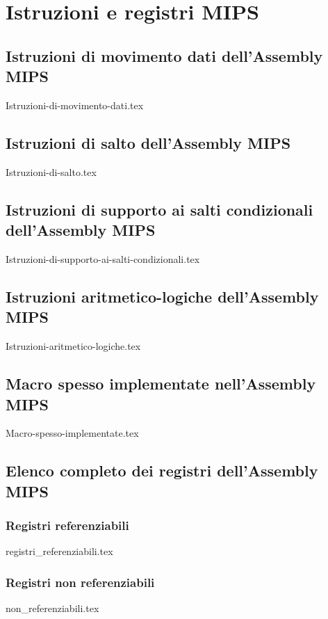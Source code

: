 \documentclass[class=book, crop=false, oneside]{standalone}
\begin{document}

\chapter{Istruzioni e registri MIPS}
\section*{Istruzioni di movimento dati dell'Assembly MIPS}
\begin{table}[H]
	\centering
	{Istruzioni-di-movimento-dati.tex}
\end{table}

\section*{Istruzioni di salto dell'Assembly MIPS}
\begin{table}[H]
	\centering
	{Istruzioni-di-salto.tex}
\end{table}

\section*{Istruzioni di supporto ai salti condizionali dell'Assembly MIPS}
\begin{table}[H]
	\centering
	{Istruzioni-di-supporto-ai-salti-condizionali.tex}
\end{table}

\section*{Istruzioni aritmetico-logiche dell'Assembly MIPS}
\begin{table}[H]
	\centering
	{Istruzioni-aritmetico-logiche.tex}
\end{table}

\section*{Macro spesso implementate nell'Assembly MIPS}
\begin{table}[H]
	\centering
	{Macro-spesso-implementate.tex}
\end{table}

\section*{Elenco completo dei registri dell'Assembly MIPS}
\subsection*{Registri referenziabili}
\begin{table}[H]
	\centering
	{registri_referenziabili.tex}
\end{table}
\subsection*{Registri non referenziabili}
\begin{table}[H]
	\centering
	{non_referenziabili.tex}
\end{table}

\restoregeometry
\end{document}

